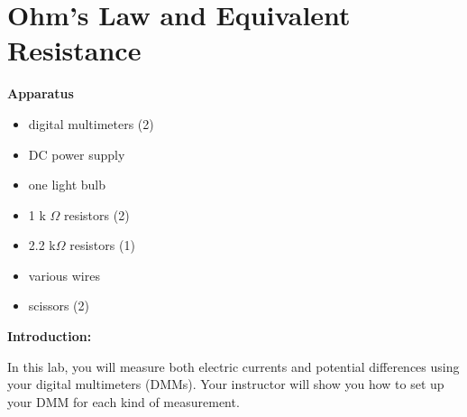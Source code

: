 
\section{Ohm's Law and Equivalent Resistance}

\makelabheader %

\textbf{Apparatus}
\begin{itemize}
\item digital multimeters (2)
\item DC power supply 
\item one light bulb
\item 1 k $\Omega$ resistors (2)
\item 2.2 k$\Omega$ resistors (1)
\item various wires
\item scissors (2)
\end{itemize}

\textbf{Introduction:}

In this lab, you will measure both electric currents and potential differences using your digital multimeters (DMMs).  Your instructor will show you how to set up your DMM for each kind of measurement.

